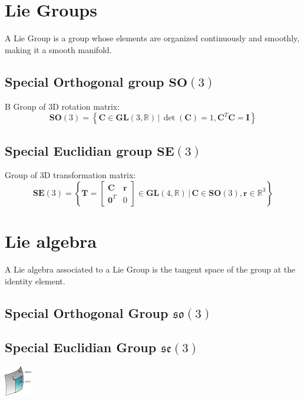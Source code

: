 \documentclass[12pt,landscape,a4paper]{article}
\newcommand{\R}{\mathbb{R}}
\newcommand{\I}{\mathrm{\mathbf{I}}}
\newcommand{\SO}{\mathrm{\mathbf{SO}}}
\newcommand{\SE}{\mathrm{\mathbf{SE}}}
\newcommand{\so}{\mathfrak{so}}
\newcommand{\se}{\mathfrak{se}}
\newcommand{\GL}{\mathrm{\mathbf{GL}}}
\newcommand{\vzero}{\mathbf{0}}
\newcommand{\C}{\mathbf{C}}
\newcommand{\T}{\mathbf{T}}
\begin{document}
\header
\begin{multicols*}{3}
\section{Lie Groups}
	A Lie Group is a group whose elements are organized continuously and smoothly, making it a smooth manifold.
	\subsection*{Special Orthogonal group $\SO(3)$}
	B
		Group of 3D rotation matrix:
		$$\SO(3) = \left\{ \C \in \GL(3,\R) \,|\, \det(\C)=1, \C^T\C=\I\right\}$$%
	\subsection*{Special Euclidian group $\SE(3)$}
		Group of 3D transformation matrix:
		$$\SE(3) = \left\{ \T =%
			\begin{bmatrix}
				\C & \mathbf{r} \\
				\vzero^T & 0
			\end{bmatrix} \in \GL(4,\R)
		\,|\, \C\in\SO(3), \mathbf{r}\in\mathbb{R}^3 \right\}$$

\section{Lie algebra}
	A Lie algebra associated to a Lie Group is the tangent space of the group at the identity element.
	\subsection*{Special Orthogonal Group $\so(3)$}
	\subsection*{Special Euclidian Group $\se(3)$}

	\begin{Figure}
		\centering
		\includegraphics[width=.7\linewidth]{media/SO3.pdf}
	\end{Figure}


\end{multicols*}
\end{document}
